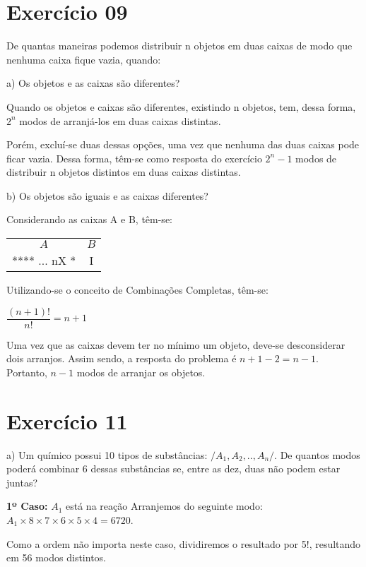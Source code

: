 \documentclass[12pt]{article}
\begin{document}
\section*{Exercício 09}

De quantas maneiras podemos distribuir n objetos em duas caixas de modo que nenhuma caixa fique vazia, quando:

\bigskip

a) Os objetos e as caixas são diferentes?

Quando os objetos e caixas são diferentes, existindo n objetos, tem, dessa forma, $2^n$ modos de arranjá-los em duas caixas distintas.

Porém, excluí-se duas dessas opções, uma vez que nenhuma das duas caixas pode ficar vazia. Dessa forma, têm-se como resposta do exercício $2^n-1$ modos de distribuir n objetos distintos em duas caixas distintas. 

\bigskip

b) Os objetos são iguais e as caixas diferentes?

Considerando as caixas A e B, têm-se:

\begin{tabular}{cc}
	$A$ & $B$ \\ 
	**** ... nX * & I \\ 
\end{tabular} 
   
Utilizando-se o conceito de Combinações Completas, têm-se: \medskip

$\displaystyle \dfrac{(n+1)!}{n!}=n+1$ \medskip

Uma vez que as caixas devem ter no mínimo um objeto, deve-se desconsiderar dois arranjos. Assim sendo, a resposta do problema é $n+1-2=n-1$. Portanto, $n-1$ modos de arranjar os objetos.

\section*{Exercício 11}

a) Um químico possui 10 tipos de substâncias: $/{A_1, A_2, .., A_n/}$. De quantos modos poderá combinar 6 dessas substâncias se, entre as dez, duas não podem estar juntas?

\textbf{1º Caso:} $A_1$ está na reação
Arranjemos do seguinte modo:
$A_1 \times 8 \times 7 \times 6 \times 5 \times 4 = 6720$.

Como a ordem não importa neste caso, dividiremos o resultado por 5!, resultando em 56 modos distintos.
\end{document}
